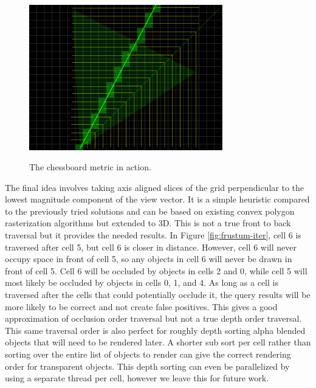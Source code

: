 \documentclass[12pt]{ucthesis}
\newcommand{\captionfonts}{\small\bf\ssp}
\begin{document}
\begin{figure}
\begin{center}
\includegraphics[width=0.75\textwidth]{Images/chess-metric.png}
\captionfonts
\caption[Chessboard Metric]{The chessboard metric in action.}
\label{fig:chess-metric}
\end{center}
\end{figure}

The final idea involves taking axis aligned slices of the grid perpendicular to the lowest magnitude component of the view vector.
It is a simple heuristic compared to the previously tried solutions and can be based on existing convex polygon rasterization algorithms but extended to 3D.
This is not a true front to back traversal but it provides the needed results.
In Figure \ref{fig:frustum-iter}, cell 6 is traversed after cell 5, but cell 6 is closer in distance.
However, cell 6 will never occupy space in front of cell 5, so any objects in cell 6 will never be drawn in front of cell 5.
Cell 6 will be occluded by objects in cells 2 and 0, while cell 5 will most likely be occluded by objects in cells 0, 1, and 4.
As long as a cell is traversed after the cells that could potentially occlude it, the query results will be more likely to be correct and not create false positives.
This gives a good approximation of occlusion order traversal but not a true depth order traversal.
This same traversal order is also perfect for roughly depth sorting alpha blended objects that will need to be rendered later.
A shorter sub sort per cell rather than sorting over the entire list of objects to render can give the correct rendering order for transparent objects.
This depth sorting can even be parallelized by using a separate thread per cell, however we leave this for future work.
\end{document}
